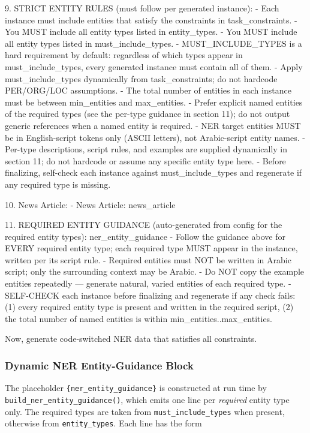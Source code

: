 \begin{Prompt}
9. STRICT ENTITY RULES (must follow per generated instance):
- Each instance must include entities that satisfy the constraints in
  {task_constraints}.
- You MUST include all entity types listed in entity_types.
- You MUST include all entity types listed in must_include_types.
- MUST_INCLUDE_TYPES is a hard requirement by default: regardless of which
  types appear in must_include_types, every generated instance must contain
  all of them.
- Apply must_include_types dynamically from {task_constraints}; do not
  hardcode PER/ORG/LOC assumptions.
- The total number of entities in each instance must be between min_entities
  and max_entities.
- Prefer explicit named entities of the required types (see the per-type
  guidance in section 11); do not output generic references when a named
  entity is required.
- NER target entities MUST be in English-script tokens only (ASCII letters),
  not Arabic-script entity names.
- Per-type descriptions, script rules, and examples are supplied dynamically
  in section 11; do not hardcode or assume any specific entity type here.
- Before finalizing, self-check each instance against must_include_types and
  regenerate if any required type is missing.

10. News Article:
- News Article: {news_article}

11. REQUIRED ENTITY GUIDANCE
    (auto-generated from config for the required entity types):
{ner_entity_guidance}
- Follow the guidance above for EVERY required entity type; each required
  type MUST appear in the instance, written per its script rule.
- Required entities must NOT be written in Arabic script; only the surrounding
  context may be Arabic.
- Do NOT copy the example entities repeatedly --- generate natural, varied
  entities of each required type.
- SELF-CHECK each instance before finalizing and regenerate if any check fails:
  (1) every required entity type is present and written in the required script,
  (2) the total number of named entities is within min_entities..max_entities.

Now, generate code-switched NER data that satisfies all constraints.
\end{Prompt}


\subsubsection{Dynamic NER Entity-Guidance Block}
\label{app:prompt:ner-guidance}

The placeholder \texttt{\{ner\_entity\_guidance\}} is constructed at run time
by \texttt{build\_ner\_entity\_guidance()}, which emits one line per
\emph{required} entity type only. The required types are taken from
\texttt{must\_include\_types} when present, otherwise from
\texttt{entity\_types}. Each line has the form

